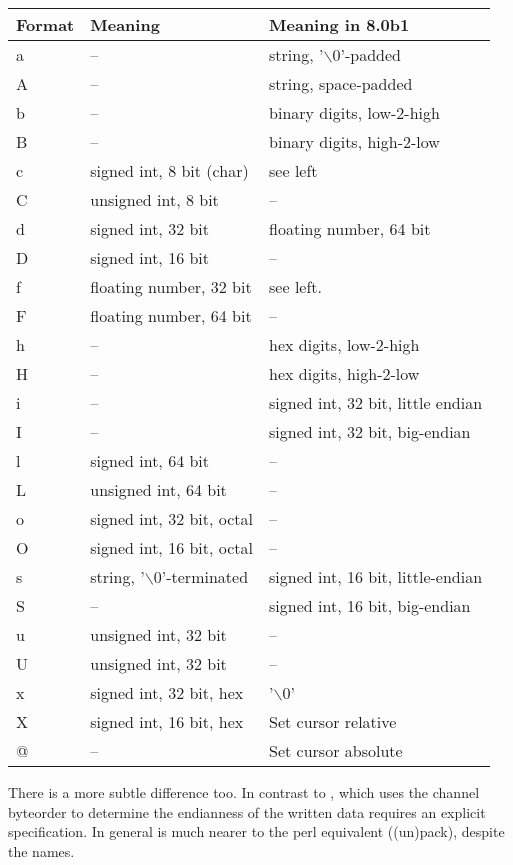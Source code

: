 \documentclass {report}
\def\strterm{$\backslash 0$}
\begin{document}
\begin {tabular}{|l|l|l|}\hline
Format & Meaning		& Meaning in 8.0b1 \\ \hline\hline
a & --				& string, '\strterm'-padded		\\ \hline
A & --				& string, space-padded			\\ \hline
b & --				& binary digits, low-2-high		\\ \hline
B & --				& binary digits, high-2-low		\\ \hline
c & signed int, 8 bit (char)	& see left				\\ \hline
C & unsigned int, 8 bit		& --					\\ \hline
d & signed int, 32 bit		& floating number, 64 bit		\\ \hline
D & signed int, 16 bit		& --					\\ \hline
f & floating number, 32 bit	& see left.				\\ \hline
F & floating number, 64 bit	& --					\\ \hline
h & --				& hex digits, low-2-high		\\ \hline
H & --				& hex digits, high-2-low		\\ \hline
i & --				& signed int, 32 bit, little endian	\\ \hline
I & --				& signed int, 32 bit, big-endian	\\ \hline
l & signed int, 64 bit		& --					\\ \hline
L & unsigned int, 64 bit	& --					\\ \hline
o & signed int, 32 bit, octal	& --					\\ \hline
O & signed int, 16 bit, octal	& --					\\ \hline
s & string, '\strterm'-terminated & signed int, 16 bit, little-endian	\\ \hline
S & --				& signed int, 16 bit, big-endian	\\ \hline
u & unsigned int, 32 bit	& --					\\ \hline
U & unsigned int, 32 bit	& --					\\ \hline
x & signed int, 32 bit, hex	& '\strterm'				\\ \hline
X & signed int, 16 bit, hex	& Set cursor relative			\\ \hline
@ & --				& Set cursor absolute			\\ \hline
\end {tabular}

There is a more subtle difference too. In contrast to ,
which uses the channel byteorder to determine the endianness of the
written data  requires an explicit specification. In
general  is much nearer to the perl equivalent
((un)pack), despite the names.
\end{document}
